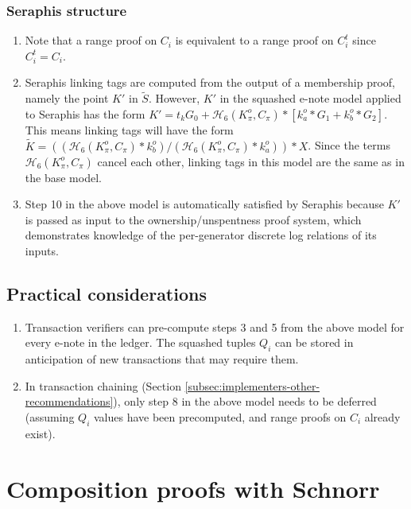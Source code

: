 \begin{appendices}
\subsubsection{Seraphis structure}

\begin{enumerate}
    \item Note that a range proof on $C_i$ is equivalent to a range proof on $C^t_i$ since $C^t_i = C_i$.

    \item Seraphis linking tags are computed from the output of a membership proof, namely the point $K'$ in $\tilde{S}$. However, $K'$ in the squashed e-note model applied to Seraphis has the form $K' = t_k G_0 + \mathcal{H}_6(K^o_{\pi}, C_{\pi})*[k^o_a*G_1 + k^o_b*G_2]$. This means linking tags will have the form $\tilde{K} = ((\mathcal{H}_6(K^o_{\pi}, C_{\pi})*k^o_b)/(\mathcal{H}_6(K^o_{\pi}, C_{\pi})*k^o_a))*X$. Since the terms $\mathcal{H}_6(K^o_{\pi}, C_{\pi})$ cancel each other, linking tags in this model are the same as in the base model.

    \item Step 10 in the above model is automatically satisfied by Seraphis because $K'$ is passed as input to the ownership/unspentness proof system, which demonstrates knowledge of the per-generator discrete log relations of its inputs.
\end{enumerate}


\subsection{Practical considerations}
\label{appendix:squashed-e-note-model-practical-considerations}

\begin{enumerate}
    \item Transaction verifiers can pre-compute steps 3 and 5 from the above model for every e-note in the ledger. The squashed tuples $Q_i$ can be stored in anticipation of new transactions that may require them.

    \item In transaction chaining (Section \ref{subsec:implementers-other-recommendations}), only step 8 in the above model needs to be deferred (assuming $Q_i$ values have been precomputed, and range proofs on $C_i$ already exist).
\end{enumerate}



\section{Composition proofs with Schnorr}
\label{appendix:composition-with-schnorr}


\end{appendices}
